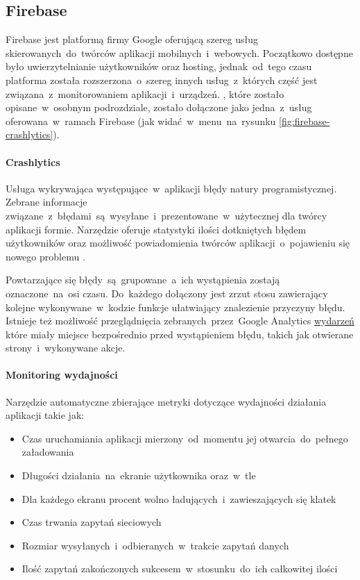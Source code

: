 \subsection{Firebase}
\label{sec:firebase}
Firebase jest platformą firmy Google oferującą szereg usług skierowanych~do~twórców aplikacji mobilnych~i~webowych. Początkowo dostępne było uwierzytelnianie użytkowników oraz hosting, jednak~od~tego czasu platforma została rozszerzona~o~szereg innych usług~z~których część jest związana~z~monitorowaniem aplikacji~i~urządzeń. , które zostało opisane~w~osobnym podrozdziale, zostało dołączone jako jedna~z~usług oferowana~w~ramach Firebase (jak widać~w~menu~na~rysunku \ref{fig:firebase-crashlytics}).


\paragraph{Crashlytics}
Usługa wykrywająca występujące~w~aplikacji błędy natury programistycznej. Zebrane informacje związane~z~błędami~są~wysyłane~i~prezentowane~w~użytecznej dla twórcy aplikacji formie. Narzędzie oferuje statystyki ilości dotkniętych błędem użytkowników oraz możliwość powiadomienia twórców aplikacji~o~pojawieniu się nowego problemu \cite{Fb_Crashlytics}.

Powtarzające się błędy~są~grupowane~a~ich wystąpienia zostają oznaczone~na~osi czasu. Do~każdego dołączony jest zrzut stosu zawierający kolejne wykonywane~w~kodzie funkcje ułatwiający znalezienie przyczyny błędu. Istnieje też możliwość przeglądnięcia zebranych~przez~Google Analytics \hyperref[par:ga-events]{wydarzeń} które miały miejsce bezpośrednio przed wystąpieniem błędu, takich jak otwierane strony~i~wykonywane akcje. 

\paragraph{Monitoring wydajności}
Narzędzie automatyczne zbierające metryki dotyczące wydajności działania aplikacji takie jak:
\begin{itemize}
	\item Czas uruchamiania aplikacji mierzony~od~momentu jej otwarcia~do~pełnego załadowania
	\item Długości działania~na~ekranie użytkownika oraz~w~tle
	\item Dla każdego ekranu procent wolno ładujących~i~zawieszających się klatek
	\item Czas trwania zapytań sieciowych
	\item Rozmiar wysyłanych~i~odbieranych~w~trakcie zapytań danych
	\item Ilość zapytań zakończonych sukcesem~w~stosunku~do~ich całkowitej ilości
\end{itemize}
\bigskip

